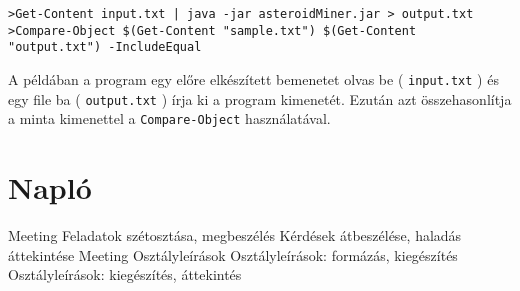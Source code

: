 \documentclass[../../projlab]{subfiles}
\begin{document}
\begin{adjustwidth}{-30pt}{0pt}
\begin{verbatim}
>Get-Content input.txt | java -jar asteroidMiner.jar > output.txt
>Compare-Object $(Get-Content "sample.txt") $(Get-Content "output.txt") -IncludeEqual
\end{verbatim}
\end{adjustwidth}

A példában a program egy előre elkészített bemenetet olvas be ( \verb"input.txt" )
és egy file ba ( \verb"output.txt" ) írja ki a program kimenetét.
Ezután azt összehasonlítja a minta kimenettel a \verb"Compare-Object" használatával.

\section{Napló}

\begin{naplo}
	{ 
		Meeting 
	}
	{ 
		Feladatok szétosztása, megbeszélés
	}
	{ 
		Kérdések átbeszélése, haladás áttekintése
	}
	{ 
		Meeting
	}
	{ 
		Osztályleírások
	}
	{ 
		Osztályleírások: formázás, kiegészítés
	}
	{ 
		Osztályleírások: kiegészítés, áttekintés
	}
\end{naplo}
\end{document}

